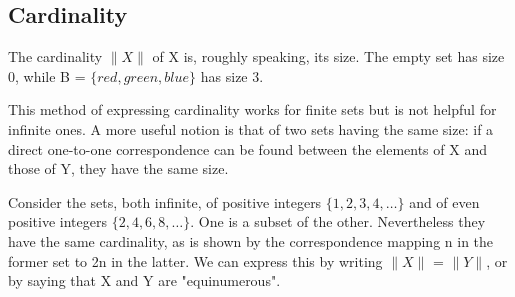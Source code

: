 \documentclass[]{article}
\begin{document}
\subsection{Cardinality}

The cardinality $\|X\|$ of X is, roughly speaking, its size. The empty set has size 0, while B = $\{red, green, blue\}$ has size 3. 

This method of expressing cardinality works for finite sets but is not helpful for infinite ones. A more useful notion is that of two sets having the same size: if a direct one-to-one correspondence can be found between the elements of X and those of Y, they have the same size. 

Consider the sets, both infinite, of positive integers $\{1,2,3,4, \ldots\}$ and of even positive integers $\{2,4,6,8, \ldots\}$. One is a subset of the other. Nevertheless they have the same cardinality, as is shown by the correspondence mapping n in the former set to 2n in the latter. We can express this by writing $\|X\|$ = $\|Y\|$, or by saying that X and Y are "equinumerous".


\end{document}
